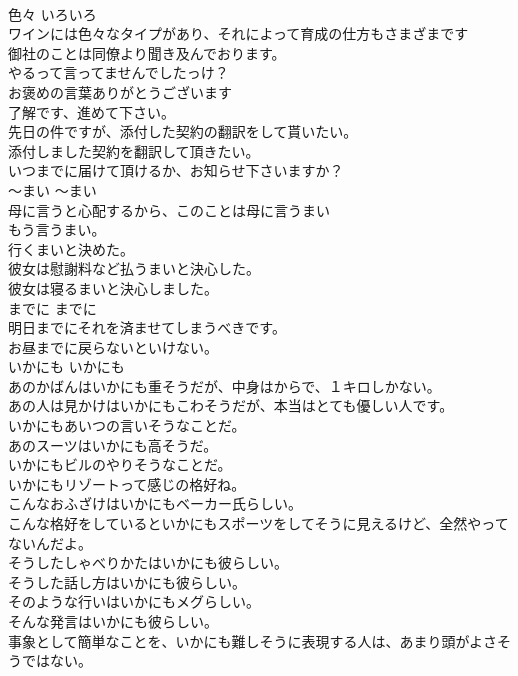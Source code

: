 \documentclass[8pt]{extreport}
\begin{document}
\begin{CJK}{UTF8}{min}
\\	色々	いろいろ	
\\	ワインには色々なタイプがあり、それによって育成の仕方もさまざまです	
\\	御社のことは同僚より聞き及んでおります。  
\\	やるって言ってませんでしたっけ？   
\\	お褒めの言葉ありがとうございます  
\\	了解です、進めて下さい。   
\\	先日の件ですが、添付した契約の翻訳をして貰いたい。
\\	添付しました契約を翻訳して頂きたい。   
\\	いつまでに届けて頂けるか、お知らせ下さいますか？  
\\	〜まい	〜まい	
\\	母に言うと心配するから、このことは母に言うまい  
\\	もう言うまい。  
\\	行くまいと決めた。  
\\	彼女は慰謝料など払うまいと決心した。   
\\	彼女は寝るまいと決心しました。  
\\	までに	までに	
\\	明日までにそれを済ませてしまうべきです。  
\\	お昼までに戻らないといけない。   
\\	いかにも	いかにも	
\\	あのかばんはいかにも重そうだが、中身はからで、１キロしかない。  
\\	あの人は見かけはいかにもこわそうだが、本当はとても優しい人です。  
\\	いかにもあいつの言いそうなことだ。  
\\	あのスーツはいかにも高そうだ。  
\\	いかにもビルのやりそうなことだ。  
\\	いかにもリゾートって感じの格好ね。  
\\	こんなおふざけはいかにもベーカー氏らしい。  
\\	こんな格好をしているといかにもスポーツをしてそうに見えるけど、全然やってないんだよ。  
\\	そうしたしゃべりかたはいかにも彼らしい。  
\\	そうした話し方はいかにも彼らしい。  
\\	そのような行いはいかにもメグらしい。  
\\	そんな発言はいかにも彼らしい。  
\\	事象として簡単なことを、いかにも難しそうに表現する人は、あまり頭がよさそうではない。  

\end{CJK}
\end{document}
